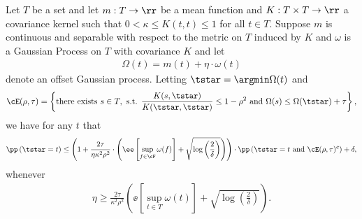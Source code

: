 \begin{theorem}\label{thm:main}
    Let $T$ be a set and let $m: T \to \rr$ be a mean function and $K: T \times T \to \rr$ a covariance kernel such that $0 < \kappa \leq K(t, t) \leq 1$ for all $t \in T$.  Suppose $m$ is continuous and separable with respect to the metric on $T$ induced by $K$ and $\omega$ is a Gaussian Process on $T$ with covariance $K$ and let
    \begin{align}
        \Omega(t) = m(t) + \eta \cdot \omega(t)
    \end{align}
    denote an offset Gaussian process.  Letting $\tstar = \argmin \Omega(t)$ and 
    \begin{align}
        \cE(\rho, \tau) = \left\{ \text{there exists } s \in T, \text{ s.t. } \frac{K(s,\tstar)}{K(\tstar, \tstar)} \leq 1 - \rho^2 \text{ and } \Omega(s) \leq \Omega(\tstar) + \tau \right\},
    \end{align}
    we have for any $t$ that
    \begin{align}
        \pp\left( \tstar = t \right) \leq \left(1 + \frac{2 \tau }{ \eta \kappa^2  \rho^2}  \cdot\left( \ee\left[ \sup_{f \in \cF} \omega(f) \right] + \sqrt{\log\left( \frac 2\delta \right)}\right)\right) \cdot \pp\left( \tstar = t \text{ and } \cE(\rho, \tau)^c \right) + \delta,
    \end{align}
    whenever
    \begin{align}
        \eta \geq \frac{2\tau}{\kappa^2 \rho^2} \left( \ee\left[ \sup_{t \in T} \omega(t) \right] + \sqrt{\log\left( \frac 2\delta \right)} \right).
    \end{align}
\end{theorem}
